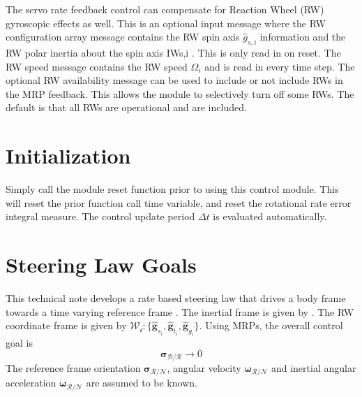 \documentclass[]{BasiliskReportMemo}
\begin{document}
The servo rate feedback control can compensate for Reaction Wheel (RW) gyroscopic effects as well. This is an optional input message where the RW configuration array message contains the RW spin axis $\hat{g}_{s,i}$ information and the RW polar inertia about the spin axis IWs,i . This is only read in on reset. The RW speed message contains the RW speed $\Omega_i$ and is read in every time step. The optional RW availability message can be used to include or not include RWs in the MRP feedback. This allows the module to selectively turn off some RWs. The default is that all RWs are operational and are included.

\section{Initialization}
Simply call the module reset function prior to using this control module.  This will reset the prior function call time variable, and reset the rotational rate error integral measure.  The control update period $\Delta t$ is evaluated automatically.  


\section{Steering Law Goals}
This technical note develops a rate based steering law that drives a body frame  towards a time varying reference frame . The inertial frame is given by .   The RW coordinate frame is given by $\mathcal{W_{i}}:\{ \hat{\bm g}_{s_{i}}, \hat{\bm g}_{t_{i}}, \hat{\bm g}_{g_{i}} \}$.  Using MRPs, the overall control goal is 
\begin{equation}
	\label{eq:MS:1}
	\bm\sigma_{\mathcal{B}/\mathcal{R}} \rightarrow 0
\end{equation}
The reference frame orientation $\bm \sigma_{\mathcal{R}/\mathcal{N}}$, angular velocity $\bm\omega_{\mathcal{R}/\mathcal{N}}$ and inertial angular acceleration $\dot{\bm \omega}_{\mathcal{R}/\mathcal{N}}$ are assumed to be known. 
\end{document}

